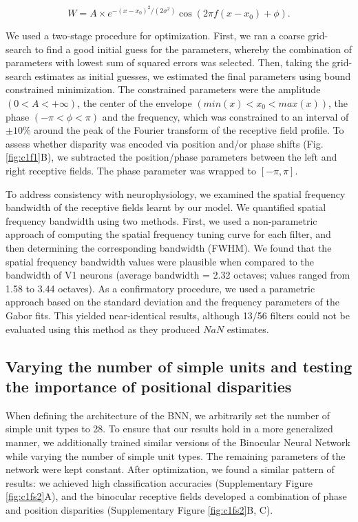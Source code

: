 \begin{equation}
  W = A \times e^{-(x-x_0)^2/(2 \sigma ^2)} \cos⁡ (2 \pi f(x-x_0)+\phi).
\end{equation}

We used a two-stage procedure for optimization. First, we ran a coarse grid-search to find a good initial guess for the parameters, whereby the combination of parameters with lowest sum of squared errors was selected. Then, taking the grid-search estimates as initial guesses, we estimated the final parameters using bound constrained minimization. The constrained parameters were the amplitude $(0<A<+\infty)$, the center of the envelope $(min(x)<x_0<max(x))$, the phase $(-\pi<\phi<\pi)$ and the frequency, which was constrained to an interval of $\pm 10\%$ around the peak of the Fourier transform of the receptive field profile. To assess whether disparity was encoded via position and/or phase shifts (Fig. \ref{fig:c1f1}B), we subtracted the position/phase parameters between the left and right receptive fields. The phase parameter was wrapped to $[-\pi,\pi]$. 

To address consistency with neurophysiology, we examined the spatial frequency bandwidth of the receptive fields learnt by our model. We quantified spatial frequency bandwidth using two methods. First, we used a non-parametric approach of computing the spatial frequency tuning curve for each filter, and then determining the corresponding bandwidth (FWHM). We found that the spatial frequency bandwidth values were plausible when compared to the bandwidth of V1 neurons \cite{De-Valois:1982fk} (average bandwidth = 2.32 octaves; values ranged from 1.58 to 3.44 octaves). As a confirmatory procedure, we used a parametric approach based on the standard deviation and the frequency parameters of the Gabor fits. This yielded near-identical results, although 13/56 filters could not be evaluated using this method as they produced $NaN$ estimates. 

\subsection*{Varying the number of simple units and testing the importance of positional disparities}

When defining the architecture of the BNN, we arbitrarily set the number of simple unit types to 28. To ensure that our results hold in a more generalized manner, we additionally trained similar versions of the Binocular Neural Network while varying the number of simple unit types. The remaining parameters of the network were kept constant. After optimization, we found a similar pattern of results: we achieved high classification accuracies (Supplementary Figure \ref{fig:c1fs2}A), and the binocular receptive fields developed a combination of phase and position disparities (Supplementary Figure \ref{fig:c1fs2}B, C). 

